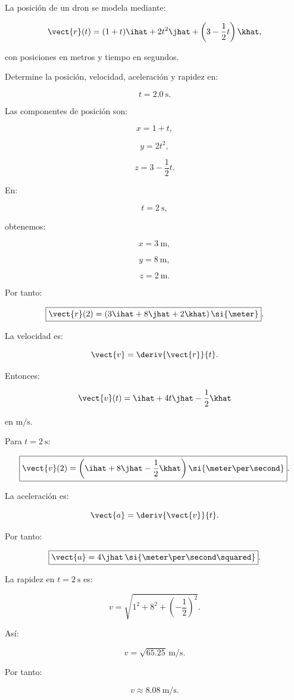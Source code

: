 \begin{ejemplo}
La posición de un dron se modela mediante:

\[
\vect{r}(t)
=
(1+t)\ihat
+
2t^2\jhat
+
\left(3-\frac{1}{2}t\right)\khat,
\]

con posiciones en metros y tiempo en segundos.

Determine la posición, velocidad, aceleración y rapidez en:

\[
t=\SI{2.0}{\second}.
\]
\end{ejemplo}

Las componentes de posición son:

\[
x=1+t,
\]

\[
y=2t^2,
\]

\[
z=3-\frac{1}{2}t.
\]

En:

\[
t=\SI{2}{\second},
\]

obtenemos:

\[
x=\SI{3}{\meter},
\]

\[
y=\SI{8}{\meter},
\]

\[
z=\SI{2}{\meter}.
\]

Por tanto:

\[
\boxed{
\vect{r}(2)
=
(3\ihat+8\jhat+2\khat)\,\si{\meter}
}.
\]

La velocidad es:

\[
\vect{v}
=
\deriv{\vect{r}}{t}.
\]

Entonces:

\[
\vect{v}(t)
=
\ihat+4t\jhat-\frac{1}{2}\khat
\]

en \(\si{\meter\per\second}\).

Para \(t=\SI{2}{\second}\):

\[
\boxed{
\vect{v}(2)
=
\left(
\ihat+8\jhat-\frac{1}{2}\khat
\right)
\si{\meter\per\second}
}.
\]

La aceleración es:

\[
\vect{a}
=
\deriv{\vect{v}}{t}.
\]

Por tanto:

\[
\boxed{
\vect{a}
=
4\jhat\,
\si{\meter\per\second\squared}
}.
\]

La rapidez en \(t=\SI{2}{\second}\) es:

\[
v
=
\sqrt{
1^2
+
8^2
+
\left(-\frac{1}{2}\right)^2
}.
\]

Así:

\[
v
=
\sqrt{65.25}\,
\si{\meter\per\second}.
\]

Por tanto:

\[
\boxed{
v\approx
\SI{8.08}{\meter\per\second}
}.
\]

